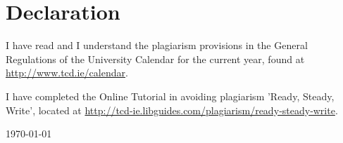 \clearpage
\thispagestyle{empty}
\section*{Declaration}
\label{sec:SOOA}

\vspace{1cm}

I have read and I understand the plagiarism provisions in the General 
Regulations of the University Calendar for the current year, found at 
\url{http://www.tcd.ie/calendar}.

\vspace{1cm}

\noindent
I have completed the Online Tutorial in avoiding plagiarism 'Ready, Steady, 
Write', located at \url{http://tcd‐ie.libguides.com/plagiarism/ready‐steady‐write}.

\vspace{1cm}
\noindent
\textbf{\thesisauthor{}} 

\vspace{0.5cm}
\noindent
\today
